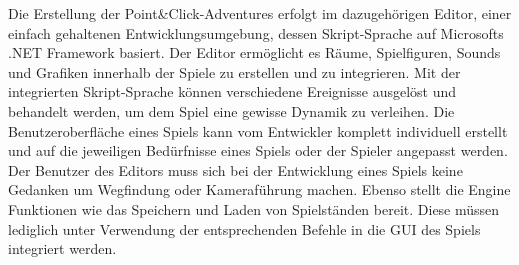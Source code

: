 Die Erstellung der Point\&Click-Adventures erfolgt im dazugehörigen Editor, einer einfach gehaltenen Entwicklungsumgebung, dessen Skript-Sprache auf Microsofts .NET Framework basiert.
Der Editor ermöglicht es Räume, Spielfiguren, Sounds und Grafiken innerhalb der Spiele zu erstellen und zu integrieren. 
Mit der integrierten Skript-Sprache können verschiedene Ereignisse ausgelöst und behandelt werden, um dem Spiel eine gewisse Dynamik zu verleihen.
Die Benutzeroberfläche eines Spiels kann vom Entwickler komplett individuell erstellt und auf die jeweiligen Bedürfnisse eines Spiels oder der Spieler angepasst werden.
Der Benutzer des Editors muss sich bei der Entwicklung eines Spiels keine Gedanken um Wegfindung oder Kameraführung machen.
Ebenso stellt die Engine Funktionen wie das Speichern und Laden von Spielständen bereit.
Diese müssen lediglich unter Verwendung der entsprechenden Befehle in die \ac{GUI} des Spiels integriert werden. \\























